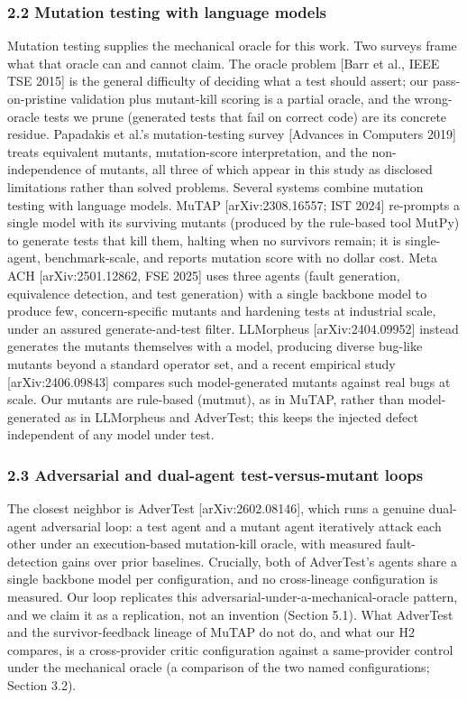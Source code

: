 \documentclass[
  11pt,
]{article}
\begin{document}
\subsubsection{2.2 Mutation testing with language
models}\label{mutation-testing-with-language-models}

Mutation testing supplies the mechanical oracle for this work. Two
surveys frame what that oracle can and cannot claim. The oracle problem
{[}Barr et al., IEEE TSE 2015{]} is the general difficulty of deciding
what a test should assert; our pass-on-pristine validation plus
mutant-kill scoring is a partial oracle, and the wrong-oracle tests we
prune (generated tests that fail on correct code) are its concrete
residue. Papadakis et al.'s mutation-testing survey {[}Advances in
Computers 2019{]} treats equivalent mutants, mutation-score
interpretation, and the non-independence of mutants, all three of which
appear in this study as disclosed limitations rather than solved
problems. Several systems combine mutation testing with language models.
MuTAP {[}arXiv:2308.16557; IST 2024{]} re-prompts a single model with
its surviving mutants (produced by the rule-based tool MutPy) to
generate tests that kill them, halting when no survivors remain; it is
single-agent, benchmark-scale, and reports mutation score with no dollar
cost. Meta ACH {[}arXiv:2501.12862, FSE 2025{]} uses three agents (fault
generation, equivalence detection, and test generation) with a single
backbone model to produce few, concern-specific mutants and hardening
tests at industrial scale, under an assured generate-and-test filter.
LLMorpheus {[}arXiv:2404.09952{]} instead generates the mutants
themselves with a model, producing diverse bug-like mutants beyond a
standard operator set, and a recent empirical study {[}arXiv:2406.09843{]} compares such model-generated mutants against real bugs at
scale. Our mutants are rule-based (mutmut), as in MuTAP, rather than
model-generated as in LLMorpheus and AdverTest; this keeps the injected
defect independent of any model under test.

\subsubsection{2.3 Adversarial and dual-agent test-versus-mutant
loops}\label{adversarial-and-dual-agent-test-versus-mutant-loops}

The closest neighbor is AdverTest {[}arXiv:2602.08146{]}, which runs a
genuine dual-agent adversarial loop: a test agent and a mutant agent
iteratively attack each other under an execution-based mutation-kill
oracle, with measured fault-detection gains over prior baselines.
Crucially, both of AdverTest's agents share a single backbone model per
configuration, and no cross-lineage configuration is measured. Our loop
replicates this adversarial-under-a-mechanical-oracle pattern, and we
claim it as a replication, not an invention (Section 5.1). What
AdverTest and the survivor-feedback lineage of MuTAP do not do, and what
our H2 compares, is a cross-provider critic configuration against a
same-provider control under the mechanical oracle (a comparison of the
two named configurations; Section 3.2).
\end{document}
